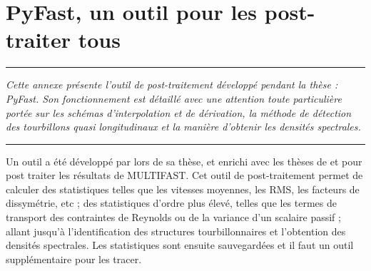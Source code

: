 
\appendix
\renewcommand\chaptername{Annexe~}

\lhead[\fancyplain{}{\leftmark}]%
      {\fancyplain{}{}} %
\chead[\fancyplain{}{}]%
      {\fancyplain{}{}}
\rhead[\fancyplain{}{}]%
      {\fancyplain{}{\rightmark}}%
\lfoot[\fancyplain{}{}]%
      {\fancyplain{}{}}
\cfoot[\fancyplain{}{\thepage}]%
      {\fancyplain{}{\thepage}} %
\rfoot[\fancyplain{}{}]%
     {\fancyplain{}{\scriptsize}}

\chapter{PyFast, un outil pour les post-traiter tous}
\label{appendix/pyfast}


\begin{center}
\rule{0.8\linewidth}{.5pt}
\begin{minipage}{0.8\linewidth}
\smallskip

\textit{Cette annexe présente l'outil de post-traitement développé pendant la thèse : PyFast. Son fonctionnement est détaillé avec une attention toute particulière portée sur les schémas d'interpolation et de dérivation, la méthode de détection des tourbillons quasi longitudinaux et la manière d'obtenir les densités spectrales.}

\end{minipage}
\smallskip
\rule{0.8\linewidth}{.5pt}
\end{center}

\newpage

Un outil a été développé par \cite{Bouillon_PhDThesis} lors de sa thèse, et enrichi avec les thèses de \cite{Doche_PhDThesis} et \cite{Bauer_PhDThesis} pour post traiter les résultats de MULTIFAST. Cet outil de post-traitement permet de calculer des statistiques telles que les vitesses moyennes, les RMS, les facteurs de dissymétrie, etc ; des statistiques d'ordre plus élevé, telles que les termes de transport des contraintes de Reynolds ou de la variance d'un scalaire passif ; allant jusqu'à l'identification des structures tourbillonnaires et l'obtention des densités spectrales. Les statistiques sont ensuite sauvegardées et il faut un outil supplémentaire pour les tracer.\\

